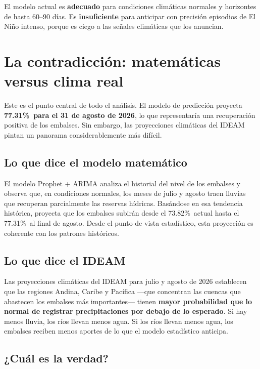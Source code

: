 \documentclass[11pt,a4paper]{article}
\newcommand{\EMBALSEACTUAL}{73.82\%}
\newcommand{\PREDAGOSTO}{77.31\%}
\begin{document}
\begin{alertbox}
El modelo actual es \textbf{adecuado} para condiciones climáticas normales y horizontes de hasta 60--90 días. Es \textbf{insuficiente} para anticipar con precisión episodios de El Niño intenso, porque es ciego a las señales climáticas que los anuncian.
\end{alertbox}

\section{La contradicción: matemáticas versus clima real}

Este es el punto central de todo el análisis. El modelo de predicción proyecta \textbf{\PREDAGOSTO\ para el 31 de agosto de 2026}, lo que representaría una recuperación positiva de los embalses. Sin embargo, las proyecciones climáticas del IDEAM pintan un panorama considerablemente más difícil.

\subsection{Lo que dice el modelo matemático}

El modelo Prophet + ARIMA analiza el historial del nivel de los embalses y observa que, en condiciones normales, los meses de julio y agosto traen lluvias que recuperan parcialmente las reservas hídricas. Basándose en esa tendencia histórica, proyecta que los embalses subirán desde el \EMBALSEACTUAL\ actual hasta el \PREDAGOSTO\ al final de agosto. Desde el punto de vista estadístico, esta proyección es coherente con los patrones históricos.

\subsection{Lo que dice el IDEAM}

Las proyecciones climáticas del IDEAM para julio y agosto de 2026 establecen que las regiones Andina, Caribe y Pacífica —que concentran las cuencas que abastecen los embalses más importantes— tienen \textbf{mayor probabilidad que lo normal de registrar precipitaciones por debajo de lo esperado}. Si hay menos lluvia, los ríos llevan menos agua. Si los ríos llevan menos agua, los embalses reciben menos aportes de lo que el modelo estadístico anticipa.

\subsection{¿Cuál es la verdad?}
\end{document}
